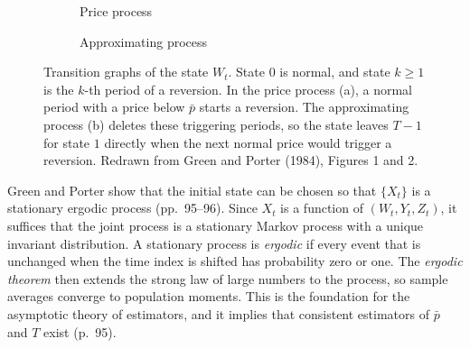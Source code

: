 \begin{figure}[htbp]
\centering
\begin{subfigure}[b]{0.48\textwidth}
\centering
{}
\caption{Price process}
\end{subfigure}\hfill
\begin{subfigure}[b]{0.48\textwidth}
\centering
{}
\caption{Approximating process}
\end{subfigure}
\caption{Transition graphs of the state $W_t$. State $0$ is normal, and state $k \ge 1$ is the $k$-th period of a
reversion. In the price process (a), a normal period with a price below $\bar p$ starts a reversion. The
approximating process (b) deletes these triggering periods, so the state leaves $T - 1$ for state $1$ directly when
the next normal price would trigger a reversion. Redrawn from Green and Porter (1984), Figures 1 and 2.}\label{fig:12-gp-chain}
\end{figure}

Green and Porter show that the initial state can be chosen so that $\{X_t\}$ is a stationary ergodic process
(pp.~95--96). Since $X_t$ is a function of $(W_t, Y_t, Z_t)$, it suffices that the joint process is a stationary
Markov process with a unique invariant distribution. A stationary process is \emph{ergodic} if every event that is
unchanged when the time index is shifted has probability zero or one. The \emph{ergodic theorem} then extends the strong law of
large numbers to the process, so sample averages converge to population moments. This is the foundation for the
asymptotic theory of estimators, and it implies that consistent estimators of $\bar p$ and $T$ exist (p.~95).


